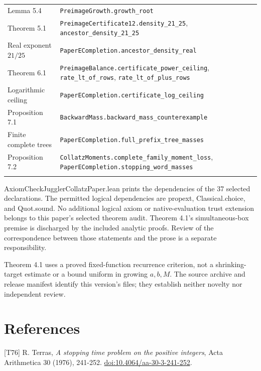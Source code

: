 \documentclass[11pt,a4paper]{article}
\begin{document}
\begin{longtable}[]{@{}
  >{\raggedright\arraybackslash}p{}
  >{\raggedright\arraybackslash}p{}@{}}
Lemma 5.4 & \texttt{\nolinkurl{PreimageGrowth.growth_root}} \\
Theorem 5.1 & \texttt{\nolinkurl{PreimageCertificate12.density_21_25}},
\texttt{\nolinkurl{ancestor_density_21_25}} \\
Real exponent \(21/25\) &
\texttt{\nolinkurl{PaperECompletion.ancestor_density_real}} \\
Theorem 6.1 &
\texttt{\nolinkurl{PreimageBalance.certificate_power_ceiling}},
\texttt{\nolinkurl{rate_lt_of_rows}},
\texttt{\nolinkurl{rate_lt_of_plus_rows}} \\
Logarithmic ceiling &
\texttt{\nolinkurl{PaperECompletion.certificate_log_ceiling}} \\
Proposition 7.1 &
\texttt{\nolinkurl{BackwardMass.backward_mass_counterexample}} \\
Finite complete trees &
\texttt{\nolinkurl{PaperECompletion.full_prefix_tree_masses}} \\
Proposition 7.2 &
\texttt{\nolinkurl{CollatzMoments.complete_family_moment_loss}},
\texttt{\nolinkurl{PaperECompletion.stopping_word_masses}} \\*
\end{longtable}

\endgroup

AxiomCheckJugglerCollatzPaper.lean prints the dependencies of the 37
selected declarations. The permitted logical dependencies are propext,
Classical.choice, and Quot.sound. No additional logical axiom or
native-evaluation trust extension belongs to this paper's selected
theorem audit. Theorem 4.1's simultaneous-box premise is discharged by
the included analytic proofs. Review of the correspondence between those
statements and the prose is a separate responsibility.

Theorem 4.1 uses a proved fixed-function recurrence criterion, not a
shrinking-target estimate or a bound uniform in growing \(a,b,M\). The
source archive and release manifest identify this version's files; they
establish neither novelty nor independent review.

\clearpage

\section{References}\label{references}

\begingroup\small

{[}T76{]} R. Terras, \emph{A stopping time problem on the positive
integers}, Acta Arithmetica 30 (1976), 241-252.
\href{https://doi.org/10.4064/aa-30-3-241-252}{doi:10.4064/aa-30-3-241-252}.
\end{document}
